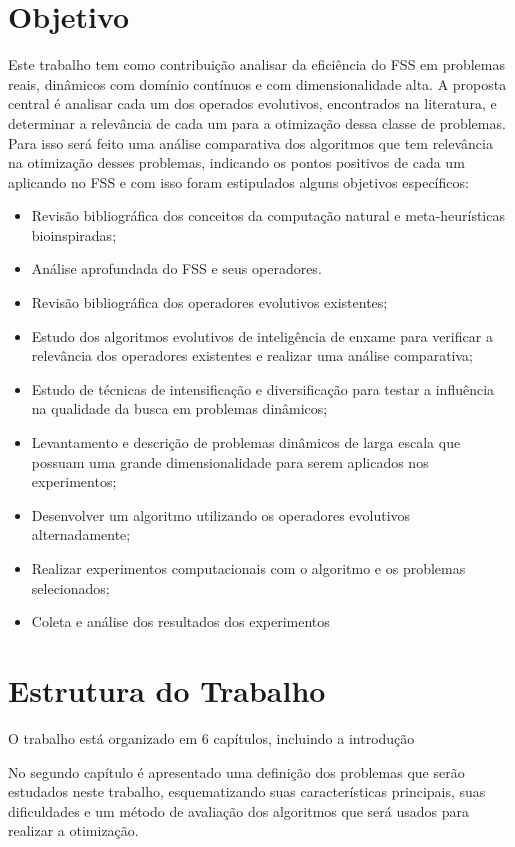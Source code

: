 \section{Objetivo}
\label{sec:objetivo}
Este trabalho tem como contribuição analisar da eficiência do FSS em problemas reais, dinâmicos com domínio contínuos e com dimensionalidade alta. A proposta central é analisar cada um dos operados evolutivos, encontrados na literatura, e determinar a relevância de cada um para a otimização dessa classe de problemas. Para isso será feito uma análise comparativa dos algoritmos que tem relevância na otimização desses problemas, indicando os pontos positivos de cada um aplicando no FSS e com isso foram estipulados alguns objetivos específicos:

\begin{itemize}
\item Revisão bibliográfica dos conceitos da computação natural e meta-heurísticas bioinspiradas;
\item Análise aprofundada do FSS e seus operadores.
\item Revisão bibliográfica dos operadores evolutivos existentes;
\item Estudo dos algoritmos evolutivos de inteligência de enxame para verificar a relevância dos operadores existentes e realizar uma análise comparativa;
\item Estudo de técnicas de intensificação e diversificação para testar a influência na qualidade da busca em problemas dinâmicos;
\item Levantamento e descrição de problemas dinâmicos de larga escala que possuam uma grande dimensionalidade para serem aplicados nos experimentos;
\item Desenvolver um algoritmo utilizando os operadores evolutivos alternadamente;
\item Realizar experimentos computacionais com o algoritmo e os problemas selecionados;
\item Coleta e análise dos resultados dos experimentos
\end{itemize} 

\section{Estrutura do Trabalho}
\label{sec:escopo}

O trabalho está organizado em 6 capítulos, incluindo a introdução

No segundo capítulo é apresentado uma definição dos problemas que serão estudados neste trabalho, esquematizando suas características principais, suas dificuldades e um método de avaliação dos algoritmos que será usados para realizar a otimização.

